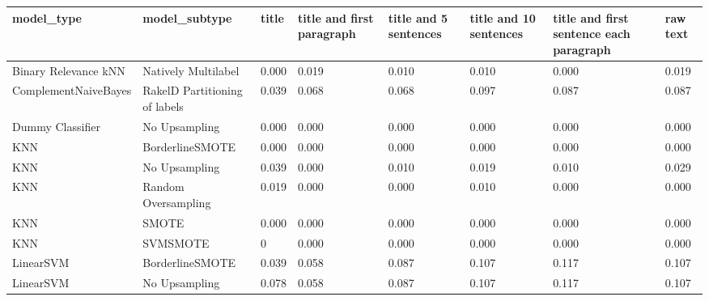\begin{tabular}{llllllll}
\toprule
                     model\_type &                 model\_subtype & title & title and first paragraph & title and 5 sentences & title and 10 sentences & title and first sentence each paragraph & raw text \\
\midrule
           Binary Relevance kNN &           Natively Multilabel & 0.000 &                     0.019 &                 0.010 &                  0.010 &                                   0.000 &    0.019 \\
           ComplementNaiveBayes & RakelD Partitioning of labels & 0.039 &                     0.068 &                 0.068 &                  0.097 &                                   0.087 &    0.087 \\
               Dummy Classifier &                 No Upsampling & 0.000 &                     0.000 &                 0.000 &                  0.000 &                                   0.000 &    0.000 \\
                            KNN &               BorderlineSMOTE & 0.000 &                     0.000 &                 0.000 &                  0.000 &                                   0.000 &    0.000 \\
                            KNN &                 No Upsampling & 0.039 &                     0.000 &                 0.010 &                  0.019 &                                   0.010 &    0.029 \\
                            KNN &           Random Oversampling & 0.019 &                     0.000 &                 0.000 &                  0.010 &                                   0.000 &    0.000 \\
                            KNN &                         SMOTE & 0.000 &                     0.000 &                 0.000 &                  0.000 &                                   0.000 &    0.000 \\
                            KNN &                      SVMSMOTE &     0 &                     0.000 &                 0.000 &                  0.000 &                                   0.000 &    0.000 \\
                      LinearSVM &               BorderlineSMOTE & 0.039 &                     0.058 &                 0.087 &                  0.107 &                                   0.117 &    0.107 \\
                      LinearSVM &                 No Upsampling & 0.078 &                     0.058 &                 0.087 &                  0.107 &                                   0.117 &    0.107 \\

\end{tabular}
